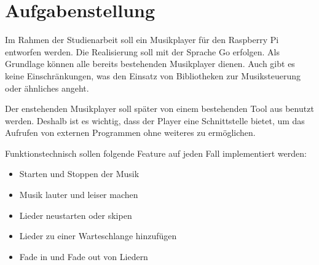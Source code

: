 
\chapter{Aufgabenstellung}

Im Rahmen der Studienarbeit soll ein Musikplayer für den Raspberry Pi entworfen
werden. Die Realisierung soll mit der Sprache Go erfolgen. Als Grundlage können
alle bereits bestehenden Musikplayer dienen. Auch gibt es keine
Einschränkungen, was den Einsatz von Bibliotheken zur Musiksteuerung oder
ähnliches angeht. \hfill \break

Der enstehenden Musikplayer soll später von einem bestehenden Tool aus benutzt
werden. Deshalb ist es wichtig, dass der Player eine Schnittstelle bietet, um
das Aufrufen von externen Programmen ohne weiteres zu ermöglichen. \hfill
\break

Funktionstechnisch sollen folgende Feature auf jeden Fall implementiert werden:
\begin{itemize}
\item Starten und Stoppen der Musik
\item Musik lauter und leiser machen
\item Lieder neustarten oder skipen
\item Lieder zu einer Warteschlange hinzufügen
\item Fade in und Fade out von Liedern
\end{itemize}

